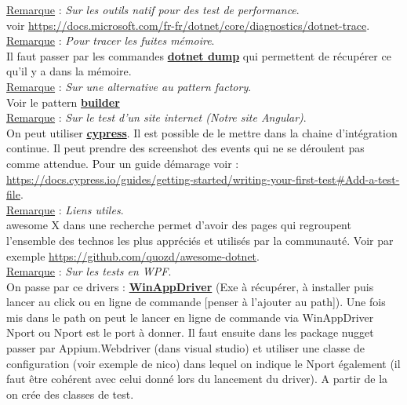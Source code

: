 \documentclass[a4paper,12pt,twoside]{article}
\newcommand{\urlcolor}{magenta}  %
\newcommand{\keycolor}{purple} %
\newcommand{\rem}[2]{\noindent\underline{Remarque} : \textit{#1}.\\ \indent #2}
\newcommand{\keyref}[2]{\hypersetup{urlcolor=\keycolor} \href{#1}{\textbf{#2}}\hypersetup{urlcolor=\urlcolor}}
\begin{document}
\rem{Sur les outils natif pour des test de performance}{voir \url{https://docs.microsoft.com/fr-fr/dotnet/core/diagnostics/dotnet-trace}.}\\

\rem{Pour tracer les fuites mémoire}{Il faut passer par les commandes \keyref{https://docs.microsoft.com/fr-fr/dotnet/core/diagnostics/dotnet-dump}{dotnet dump} qui permettent de récupérer ce qu'il y a dans la mémoire.}\\

\rem{Sur une alternative au pattern factory}{Voir le pattern \keyref{https://refactoring.guru/design-patterns/builder}{builder}}\\

\rem{Sur le test d'un site internet (Notre site Angular)}{On peut utiliser \keyref{https://github.com/cypress-io/cypress}{cypress}. Il est possible de le mettre dans la chaine d'intégration continue. Il peut prendre des screenshot des events qui ne se déroulent pas comme attendue. Pour un guide démarage voir : \url{https://docs.cypress.io/guides/getting-started/writing-your-first-test\#Add-a-test-file}.}\\

\rem{Liens utiles}{awesome X dans une recherche permet d'avoir des pages qui regroupent l'ensemble des technos les plus appréciés et utilisés par la communauté. Voir par exemple \url{https://github.com/quozd/awesome-dotnet}.}\\

\rem{Sur les tests en WPF}{On passe par ce drivers : \keyref{https://github.com/microsoft/WinAppDriver}{WinAppDriver} (Exe à récupérer, à installer puis lancer au click ou en ligne de commande [penser à l'ajouter au path]). Une fois mis dans le path on peut le lancer en ligne de commande via WinAppDriver Nport ou Nport est le port à donner. Il faut ensuite dans les package nugget passer par Appium.Webdriver (dans visual studio) et utiliser une classe de configuration (voir exemple de nico) dans lequel on indique le Nport également (il faut être cohérent avec celui donné lors du lancement du driver). A partir de la on crée des classes de test.}\\


\end{document}
